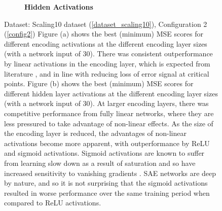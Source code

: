 \documentclass[a4paper,11pt,oneside]{article}
\theoremstyle{plain}
\theoremstyle{definition}
\begin{document}
\begin{figure}[H]
\begin{subfigure}{.99\textwidth}
			\caption[MSE by Activations and Encoding Layer Size - Hidden Activations]{\textbf{Hidden Activations} 
				\newline }
			\label{figure-actual_mse_hidden_activations}
		\end{subfigure}
		\caption[MSE by Activations and Encoding Layer Size]
		{Dataset: Scaling10 dataset (\ref{dataset_scaling10}), Configuration 2 (\ref{config2})
			\newline Figure (a) shows the best (minimum) MSE scores for different encoding activations at the different encoding layer sizes (with a network input of 30). There was consistent outperformance by linear activations in the encoding layer, which is expected from literature \citep{Hinton2}, and in line with reducing loss of error signal at critical points. 
			\newline Figure (b) shows the best (minimum) MSE scores for different hidden layer activations at the different encoding layer sizes (with a network input of 30). At larger encoding layers, there was competitive performance from fully linear networks, where they are less pressured to take advantage of non-linear effects. As the size of the encoding layer is reduced, the advantages of non-linear activations become more apparent, with outperformance by ReLU and sigmoid activations. Sigmoid activations are known to suffer from learning slow down as a result of saturation and so have increased sensitivity to vanishing gradients \citep{Glorot2}. SAE networks are deep by nature, and so it is not surprising that the sigmoid activations resulted in worse performance over the same training period when compared to ReLU activations. \newline}
		\label{figure-mse_encoding_activations}
	\end{figure}
	
\end{document}
